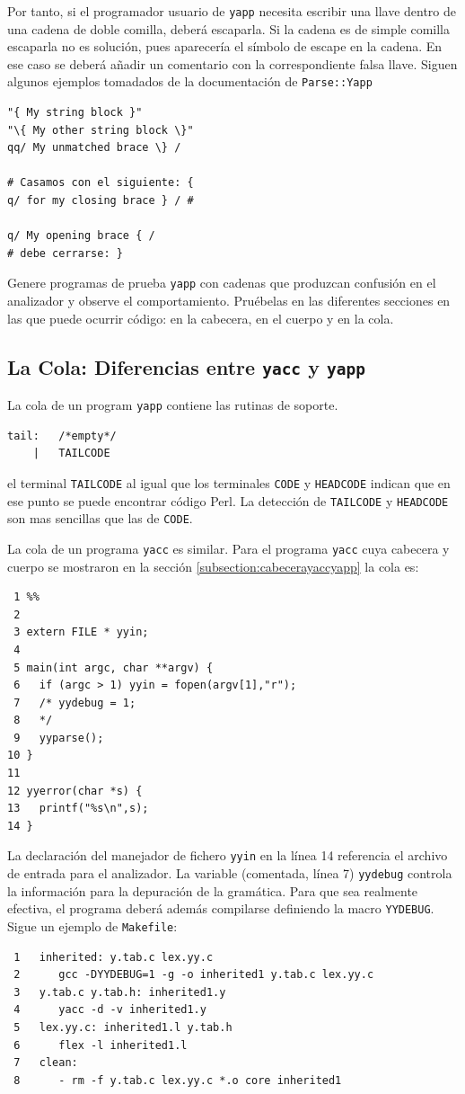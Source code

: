 Por tanto, si el programador usuario de \verb|yapp| necesita 
escribir una llave dentro de una cadena de doble comilla, deberá escaparla.
Si la cadena es de simple comilla escaparla no es solución, pues 
aparecería el símbolo de escape en la cadena. En ese caso se deberá añadir 
un comentario con la correspondiente falsa llave. Siguen
algunos ejemplos tomadados de la documentación de \verb|Parse::Yapp|
\begin{verbatim}
"{ My string block }"
"\{ My other string block \}"
qq/ My unmatched brace \} /

# Casamos con el siguiente: {
q/ for my closing brace } / # 

q/ My opening brace { /
# debe cerrarse: }
\end{verbatim}

\begin{exercise}
Genere programas de prueba \verb|yapp| con cadenas que produzcan confusión
en el analizador y observe el comportamiento. Pruébelas en las diferentes
secciones en las que puede ocurrir código: en la cabecera, en el cuerpo 
y en la cola.
\end{exercise}

\subsection{La Cola: Diferencias entre {\tt yacc} y {\tt yapp}}
\label{subsection:colayaccyapp}
La cola de un program \verb|yapp| contiene las rutinas de soporte.
\begin{verbatim}
tail:   /*empty*/
    |   TAILCODE   
\end{verbatim}
el terminal \verb|TAILCODE| al igual que los terminales
\verb|CODE| y \verb|HEADCODE| indican que en ese punto se puede encontrar 
código Perl. La detección de \verb|TAILCODE| y \verb|HEADCODE| son mas sencillas
que las de \verb|CODE|.

La cola de un programa \verb|yacc| es similar.
Para el programa \verb|yacc| cuya cabecera y cuerpo
se mostraron en la sección 
\ref{subsection:cabecerayaccyapp}
la cola es:
\begin{verbatim}
 1 %%
 2 
 3 extern FILE * yyin;
 4 
 5 main(int argc, char **argv) {
 6   if (argc > 1) yyin = fopen(argv[1],"r");
 7   /* yydebug = 1;
 8   */
 9   yyparse();
10 }
11 
12 yyerror(char *s) {
13   printf("%s\n",s);
14 }
\end{verbatim}

La declaración del manejador de fichero \verb|yyin| en la línea 14 
referencia el archivo 
de entrada para el analizador. La variable (comentada, línea 7) 
\verb|yydebug| controla la información para la depuración de la gramática.
Para que sea realmente efectiva, el programa deberá además compilarse
definiendo la macro \verb|YYDEBUG|. Sigue un ejemplo
de \verb|Makefile|:
\begin{verbatim}
 1   inherited: y.tab.c lex.yy.c
 2      gcc -DYYDEBUG=1 -g -o inherited1 y.tab.c lex.yy.c
 3   y.tab.c y.tab.h: inherited1.y 
 4      yacc -d -v inherited1.y 
 5   lex.yy.c: inherited1.l y.tab.h
 6      flex -l inherited1.l
 7   clean:
 8      - rm -f y.tab.c lex.yy.c *.o core inherited1
\end{verbatim}

